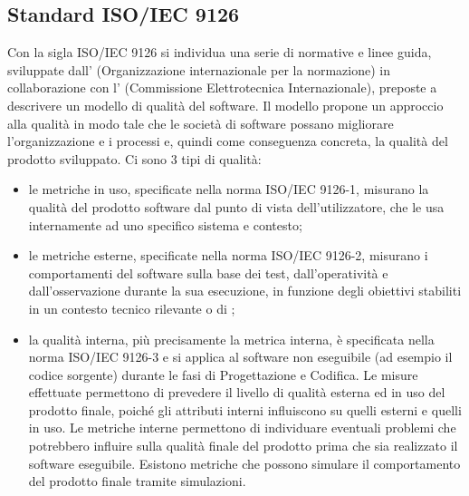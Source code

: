 
\subsection{Standard ISO/IEC 9126} %

Con la sigla ISO/IEC 9126 si individua una serie di normative e linee guida, sviluppate dall' (Organizzazione internazionale per la normazione) in collaborazione con l' (Commissione Elettrotecnica Internazionale), preposte a descrivere un modello di qualità del software. Il modello propone un approccio alla qualità in modo tale che le società di software possano migliorare l'organizzazione e i processi e, quindi come conseguenza concreta, la qualità del prodotto sviluppato. Ci sono 3 tipi di qualità:
\begin{itemize}
\item {} le metriche in uso, specificate nella norma ISO/IEC 9126-1, misurano la qualità del prodotto software dal punto di vista dell'utilizzatore, che le usa internamente ad uno specifico sistema e contesto;
\end{itemize}
\begin{itemize}
\item {} le metriche esterne, specificate nella norma ISO/IEC 9126-2, misurano i comportamenti del software sulla base dei test, dall'operatività e dall'osservazione durante la sua esecuzione, in funzione degli obiettivi stabiliti in un contesto tecnico rilevante o di ;
\end{itemize}
\begin{itemize}
\item {} la qualità interna, più precisamente la metrica interna, è specificata nella norma ISO/IEC 9126-3 e si applica al software non eseguibile (ad esempio il codice sorgente) durante le fasi di Progettazione e Codifica. Le misure effettuate permettono di prevedere il livello di qualità esterna ed in uso del prodotto finale, poiché gli attributi interni influiscono su quelli esterni e quelli in uso. Le metriche interne permettono di individuare eventuali problemi che potrebbero influire sulla qualità finale del prodotto prima che sia realizzato il software eseguibile. Esistono metriche che possono simulare il comportamento del prodotto finale tramite simulazioni.
\end{itemize}


